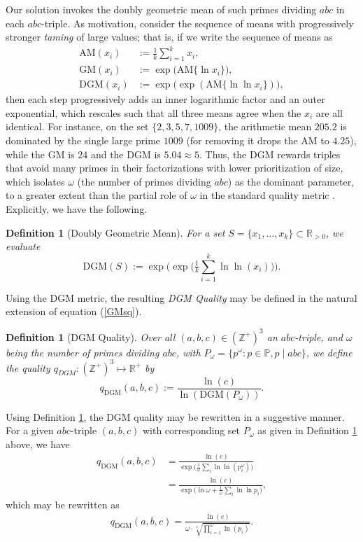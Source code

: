 \documentclass[11pt,letterpaper]{amsart}
\newtheorem{definition}[theorem]{Definition}
\def\R{\mathbb{R}}
\def\Z{\mathbb{Z}}
\def\R{\mathbb{R}}
\def\Z{\mathbb{Z}}
\begin{document}
Our solution invokes the doubly geometric mean of such primes dividing $abc$ in each $abc$-triple. As motivation, consider the sequence of means with progressively stronger \textit{taming} of large values; that is, if we write the sequence of means as
\begin{align*}
\mathrm{AM}(x_i) &:= \tfrac{1}{k}\sum_{i = 1}^{k} x_i,\\
\mathrm{GM}(x_i) &:= \exp\bigl(\mathrm{AM}\{\ln x_i\}\bigr),\\
\mathrm{DGM}(x_i) &:= \exp\bigl(\exp(\mathrm{AM}\{\ln\ln x_i\})\bigr),
\end{align*} 
then each step progressively adds an inner logarithmic factor and an outer exponential, which rescales such that all three means agree when the $x_i$ are all identical. For instance, on the set $\{2,3,5,7,1009\}$, the arithmetic mean $205.2$ is dominated by the single large prime $1009$ (for removing it drops the AM to $4.25$), while the GM is $24$ and the DGM is $5.04 \approx 5$. Thus, the DGM rewards triples that avoid many primes in their factorizations with lower prioritization of size, which isolates $\omega$ (the number of primes dividing $abc$) as the dominant parameter, to a greater extent than the partial role of $\omega$ in the standard quality metric \cite{deweger1989}. Explicitly, we have the following.
\begin{definition}[Doubly Geometric Mean]\label{D_DGM_Mean}
For a set $S=\{x_1,\dots,x_k\}\subset\mathbb{R}_{>0}$, we evaluate
\[
    \mathrm{DGM}(S) := \exp\Big(\exp\Big(\tfrac{1}{k} \sum_{i = 1}^{k} \ln\ln(x_i)\Big)\Big).
\]
\end{definition}
Using the DGM metric, the resulting \textit{DGM Quality} may be defined in the natural extension of equation (\ref{GMsq}).
\begin{definition}[DGM Quality]\label{D_DGM_Quality}
Over all $(a,b,c) \in (\Z^{+})^3$ an $abc$-triple, and $\omega$ being the number of primes dividing $abc$, with $P_\omega=\{p^\omega:p\in \mathbb{P}, p \mid abc \}$, we define the quality $q_{DGM}: (\Z^{+})^3 \mapsto \R^{+}$ by
\[
    q_{\mathrm{DGM}}(a, b, c) := \frac{\ln(c)}{\ln(\mathrm{DGM}(P_{\omega}))}.
\]
\end{definition}
Using Definition \ref{D_DGM_Mean}, the DGM quality may be rewritten in a suggestive manner. For a given $abc$-triple $(a, b, c)$ with corresponding set $P_{\omega}$ as given in Definition \ref{D_DGM_Quality} above, we have
\begin{align*}
q_{\mathrm{DGM}}(a, b, c) &= \frac{\ln(c)}{\exp\!\bigl(\tfrac{1}{\omega}\sum_i \ln\ln(p_i^\omega)\bigr)} \\
&= \frac{\ln(c)}{\exp\!\bigl(\ln\omega + \tfrac{1}{\omega}\sum_i \ln\ln p_i\bigr)},
\end{align*}
which may be rewritten as
\begin{align}\label{eq3}
    q_{\mathrm{DGM}}(a,b,c) = \frac{\ln(c)}{\omega \cdot \sqrt[\omega]{\prod_{i = 1}^{\omega} \ln(p_i)}}.
\end{align}
\end{document}
